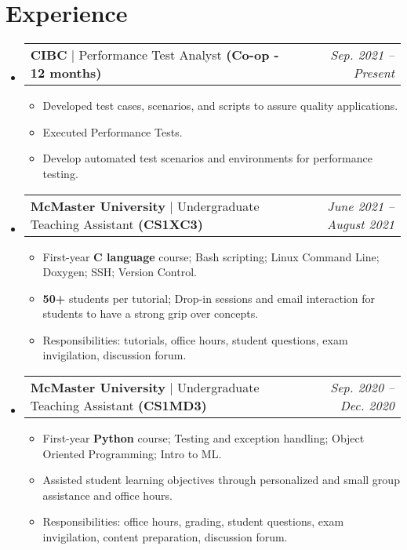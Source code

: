 \documentclass[letterpaper,11pt]{article}
\makeatletter
\newcommand{\resumeItem}[1]{
  \item\small{
    {#1 \vspace{-2pt}}
  }
}
\newcommand{\resumeSubheading}[2]{
  \vspace{-2pt}\item
    \begin{tabular*}{0.97\textwidth}[t]{l@{\extracolsep{\fill}}r}
      #1 & #2 \\
    \end{tabular*}\vspace{-7pt}
}
\newcommand{\resumeSubHeadingListStart}{\begin{itemize}[leftmargin=0.15in, label={}]}
\newcommand{\resumeSubHeadingListEnd}{\end{itemize}}
\newcommand{\resumeItemListStart}{\begin{itemize}}
\newcommand{\resumeItemListEnd}{\end{itemize}\vspace{-5pt}}
\makeatother
\begin{document}
\section{Experience}
  \resumeSubHeadingListStart
    \resumeSubheading
      {\textbf{CIBC} $|$ \small Performance Test Analyst \textbf{(Co-op - 12 months)}}{\textit{\small Sep. 2021 -- Present}}
      \resumeItemListStart
        \resumeItem{Developed test cases, scenarios, and scripts to assure quality applications.}
        \resumeItem{Executed Performance Tests.}
        \resumeItem{Develop automated test scenarios and environments for performance testing.}
      \resumeItemListEnd
    \resumeSubheading
      {\textbf{McMaster University} $|$ \small Undergraduate Teaching Assistant \textbf{(CS1XC3)}}{\textit{\small June 2021 -- August 2021}}
      \resumeItemListStart
        \resumeItem{First-year \textbf{C language} course; Bash scripting; Linux Command Line; Doxygen; SSH; Version Control.}
        \resumeItem{\textbf{50+} students per tutorial; Drop-in sessions and email interaction for students to have a strong grip over concepts.}
        \resumeItem{Responsibilities: tutorials, office hours, student questions, exam invigilation, discussion forum.}
      \resumeItemListEnd
    \resumeSubheading
      {\textbf{McMaster University} $|$ \small Undergraduate Teaching Assistant \textbf{(CS1MD3)}}{\textit{\small Sep. 2020 -- Dec. 2020}}
      \resumeItemListStart
        \resumeItem{First-year \textbf{Python} course; Testing and exception handling; Object Oriented Programming; Intro to ML.}
        \resumeItem{Assisted student learning objectives through personalized and small group assistance and office hours.}
        \resumeItem{Responsibilities: office hours, grading, student questions, exam invigilation, content preparation, discussion forum.}
      \resumeItemListEnd
    
  \resumeSubHeadingListEnd

\end{document}
